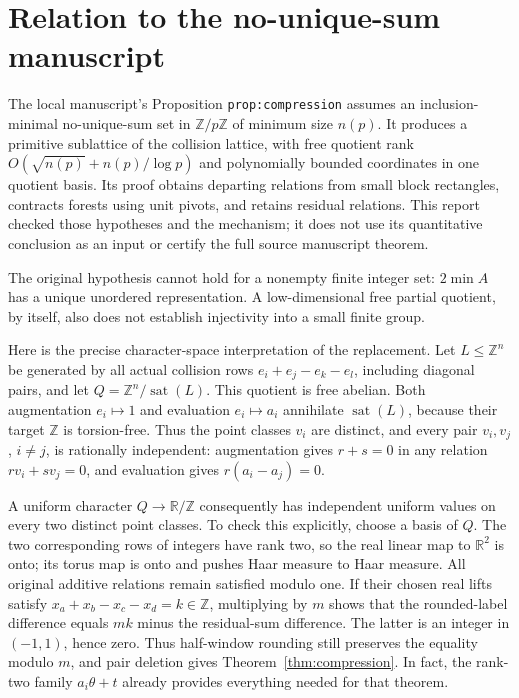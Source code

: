 \documentclass[11pt]{article}
\theoremstyle{definition}
\theoremstyle{remark}
\newcommand{\Z}{\mathbb Z}
\newcommand{\R}{\mathbb R}
\newcommand{\T}{\mathbb R/\mathbb Z}
\DeclareMathOperator{\sat}{sat}
\begin{document}
\section{Relation to the no-unique-sum manuscript}

The local manuscript's Proposition \texttt{prop:compression} assumes an
inclusion-minimal no-unique-sum set in $\Z/p\Z$ of minimum size $n(p)$.
It produces a primitive sublattice of the collision lattice, with free
quotient rank $O(\sqrt{n(p)}+n(p)/\log p)$ and polynomially bounded
coordinates in one quotient basis. Its proof obtains departing
relations from small block rectangles, contracts forests using unit
pivots, and retains residual relations. This report checked those
hypotheses and the mechanism; it does not use its quantitative conclusion
as an input or certify the full source manuscript theorem.

The original hypothesis cannot hold for a nonempty finite integer set:
$2\min A$ has a unique unordered representation. A low-dimensional free
partial quotient, by itself, also does not establish injectivity into
a small finite group.

Here is the precise character-space interpretation of the replacement.
Let $L\le\Z^n$ be generated by all actual collision rows
$e_i+e_j-e_k-e_l$, including diagonal pairs, and let
$Q=\Z^n/\sat(L)$. This quotient is free abelian. Both augmentation
$e_i\mapsto1$ and evaluation $e_i\mapsto a_i$ annihilate $\sat(L)$,
because their target $\Z$ is torsion-free. Thus the point classes
$v_i$ are distinct, and every pair $v_i,v_j$, $i\ne j$, is rationally
independent: augmentation gives $r+s=0$ in any relation
$rv_i+sv_j=0$, and evaluation gives $r(a_i-a_j)=0$.

A uniform character $Q\to\T$ consequently has independent uniform
values on every two distinct point classes. To check this explicitly,
choose a basis of $Q$. The two corresponding rows of integers have rank
two, so the real linear map to $\R^2$ is onto; its torus map is onto and
pushes Haar measure to Haar measure. All original additive relations
remain satisfied modulo one. If their chosen real lifts satisfy
$x_a+x_b-x_c-x_d=k\in\Z$, multiplying by $m$ shows that the
rounded-label difference equals $mk$ minus the residual-sum difference.
The latter is an integer in $(-1,1)$, hence zero. Thus half-window
rounding still preserves the equality modulo $m$, and pair deletion
gives Theorem~\ref{thm:compression}. In fact, the rank-two
family $a_i\theta+t$ already provides everything needed for that theorem.
\end{document}
